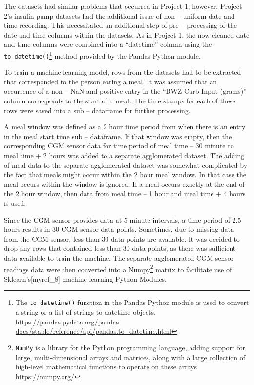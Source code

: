 The datasets had similar problems that occurred in Project 1; however, Project 2's insulin pump datasets had the additional issue of non -- uniform date and time recording.  This necessitated an additional step of pre -- processing of the date and time columns within the datasets.  As in Project 1, the now cleaned date and time columns were combined into a ``datetime'' column using the \texttt{to\_datetime()}\footnote{The \texttt{to\_datetime()} function in the Pandas Python module is used to convert a string or a list of strings to datetime objects. \href{https://pandas.pydata.org/pandas-docs/stable/reference/api/pandas.to\_datetime.html}{https://pandas.pydata.org/pandas-docs/stable/reference/api/pandas.to\_datetime.html}} method provided by the Pandas Python module.

To train a machine learning model, rows from the datasets had to be extracted that corresponded to the person eating a meal.  It was assumed that an occurrence of a non -- NaN and positive entry in the ``BWZ Carb Input (grams)'' column corresponds to the start of a meal.  The time stamps for each of these rows were saved into a sub -- dataframe for further processing.

A meal window was defined as a 2 hour time period from when there is an entry in the meal start time sub -- dataframe.  If that window was empty, then the corresponding CGM sensor data for time period of meal time -- 30 minute to meal time + 2 hours was added to a separate agglomerated dataset.  The adding of meal data to the separate agglomerated dataset was somewhat complicated by the fact that meals might occur within the 2 hour meal window.  In that case the meal occurs within the window is ignored.  If a meal occurs exactly at the end of the 2 hour window, then data from meal time -- 1 hour and meal time + 4 hours is used.

Since the CGM sensor provides data at 5 minute intervals, a time period of 2.5 hours results in 30 CGM sensor data points.  Sometimes, due to missing data from the CGM sensor, less than 30 data points are available.  It was decided to drop any rows that contained less than 30 data points, as there was sufficient data available to train the machine.  The separate agglomerated CGM sensor readings data were then converted into a Numpy\footnote{\texttt{NumPy} is a library for the Python programming language, adding support for large, multi-dimensional arrays and matrices, along with a large collection of high-level mathematical functions to operate on these arrays. \url{https://numpy.org/}} matrix to facilitate use of Sklearn's[myref\_8] machine learning Python Modules.

